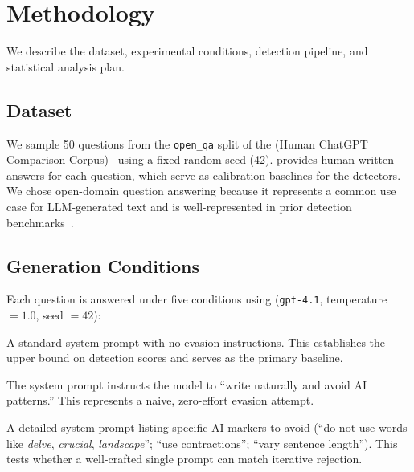 \section{Methodology}
\label{sec:methodology}

We describe the dataset, experimental conditions, detection pipeline, and statistical analysis plan.

\subsection{Dataset}
\label{sec:dataset}

We sample 50 questions from the \texttt{open\_qa} split of the \hcthree (Human ChatGPT Comparison Corpus)~\cite{guo2023hc3} using a fixed random seed (42).
\hcthree provides human-written answers for each question, which serve as calibration baselines for the detectors.
We chose open-domain question answering because it represents a common use case for LLM-generated text and is well-represented in prior detection benchmarks~\cite{dugan2024raid}.

\subsection{Generation Conditions}
\label{sec:conditions}

Each question is answered under five conditions using \gptfour (\texttt{gpt-4.1}, temperature $= 1.0$, seed $= 42$):

A standard system prompt with no evasion instructions. This establishes the upper bound on detection scores and serves as the primary baseline.

The system prompt instructs the model to ``write naturally and avoid AI patterns.'' This represents a naive, zero-effort evasion attempt.

A detailed system prompt listing specific AI markers to avoid (\eg ``do not use words like \emph{delve}, \emph{crucial}, \emph{landscape}''; ``use contractions''; ``vary sentence length'').
This tests whether a well-crafted single prompt can match iterative rejection.

